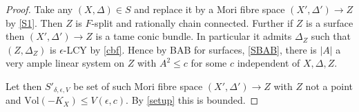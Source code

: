 \documentclass[a4paper,12pt]{book}
\newcommand{\Vol}{\text{Vol}}
\begin{document}
\begin{proof}
	Take any $(X,\Delta)\in S$ and replace it by a Mori fibre space $(X',\Delta') \to Z$ by \autoref{S1}. Then $Z$ is $F$-split and rationally chain connected. Further if $Z$ is a surface then $(X',\Delta')\to Z$ is a tame conic bundle. In particular it admits $\Delta_{Z}$ such that $(Z,\Delta_{Z})$ is $\epsilon$-LCY by \autoref{cbf}. Hence by BAB for surfaces, \autoref{SBAB}, there is $|A|$ a very ample linear system on $Z$ with $A^{2}\leq c$ for some $c$ independent of $X,\Delta,Z$. 
	
	Let then $S'_{\delta,\epsilon,V}$ be set of such Mori fibre space $(X',\Delta') \to Z$ with $Z$ not a point and $\Vol(-K_{X})\leq V(\epsilon,c)$. By \autoref{setup} this is bounded.	
\end{proof}



\end{document}
